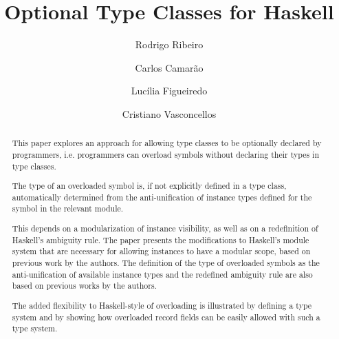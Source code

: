 \documentclass{llncs}
\begin{document}




\mainmatter 

\title{Optional Type Classes for Haskell}

\author{Rodrigo Ribeiro  \and Carlos Camar\~ao \and Luc\'ilia
Figueiredo \and Cristiano Vasconcellos}
\maketitle 

\begin{abstract}

This paper explores an approach for allowing type classes to be
optionally declared by programmers, i.e. programmers can overload
symbols without declaring their types in type classes.

The type of an overloaded symbol is, if not explicitly defined in a
type class, automatically determined from the anti-unification of
instance types defined for the symbol in the relevant module.

This depends on a modularization of instance visibility, as well as on
a redefinition of Haskell's ambiguity rule. The paper presents the
modifications to Haskell's module system that are necessary for
allowing instances to have a modular scope, based on previous work by
the authors. The definition of the type of overloaded symbols as the
anti-unification of available instance types and the redefined
ambiguity rule are also based on previous works by the authors.

The added flexibility to Haskell-style of overloading is illustrated
by defining a type system and by showing how overloaded record fields
can be easily allowed with such a type system.


\end{abstract}
\end{document}
